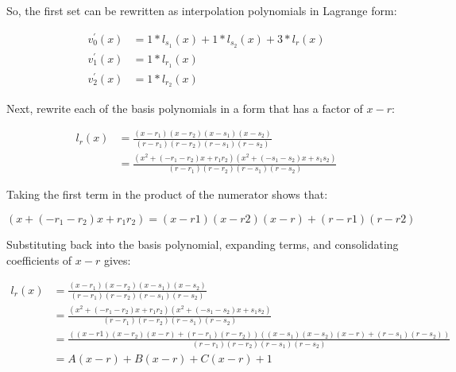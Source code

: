 \documentclass{article}
\begin{document}
\noindent So, the first set can be rewritten as interpolation polynomials in Lagrange form:

\begin{align*}
    v^{'}_{0}(x) &= 1 * l_{s_{1}}(x) + 1 * l_{s_{2}}(x) + 3 * l_{r}(x) \\
    v^{'}_{1}(x) &= 1 * l_{r_{1}}(x) \\
    v^{'}_{2}(x) &= 1 * l_{r_{2}}(x)
\end{align*}

\noindent Next, rewrite each of the basis polynomials in a form that has a factor
of $ x - r $:

\begin{align*}
    l_{r}(x) &= \frac{(x  - r_{1}) (x  - r_{2}) (x  - s_{1}) (x  - s_{2})}{(r  - r_{1}) (r  - r_{2}) (r  - s_{1}) (r  - s_{2})} \\
    &= \frac{(x^{2} + (-r_{1} - r_{2}) x + r_{1} r_{2}) (x^{2} + (-s_{1} - s_{2}) x + s_{1} s_{2})}{(r  - r_{1}) (r  - r_{2}) (r  - s_{1}) (r  - s_{2})}
\end{align*}


\noindent Taking the first term in the product of the numerator shows that:

\[
    (x + (-r_{1} - r_{2}) x + r_{1} r_{2}) = (x - r1) (x - r2) (x - r) + (r - r1) (r - r2)  
\]

\noindent Substituting back into the basis polynomial, expanding terms, and consolidating coefficients of $ x - r $
gives:

\begin{align*}
    l_{r}(x) &= \frac{(x  - r_{1}) (x  - r_{2}) (x  - s_{1}) (x  - s_{2})}{(r  - r_{1}) (r  - r_{2}) (r  - s_{1}) (r  - s_{2})} \\
    &= \frac{(x^{2} + (-r_{1} - r_{2}) x + r_{1} r_{2}) (x^{2} + (-s_{1} - s_{2}) x + s_{1} s_{2})}{(r  - r_{1}) (r  - r_{2}) (r  - s_{1}) (r  - s_{2})} \\
    &= \frac{((x - r1) (x - r_{2}) (x - r) + (r - r_{1}) (r - r_{2}))((x - s_{1}) (x - s_{2}) (x - r) + (r - s_{1}) (r - s_{2}))}{(r  - r_{1}) (r  - r_{2}) (r  - s_{1}) (r  - s_{2})} \\
    &=  A (x - r) + B (x - r) + C (x - r) + 1
\end{align*}
\end{document}
